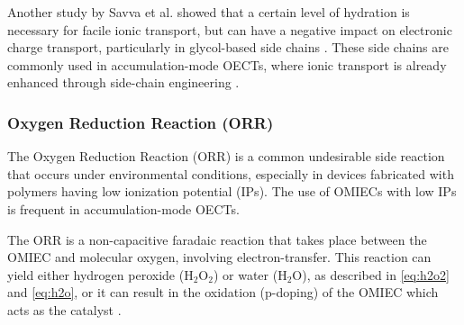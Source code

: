 
Another study by Savva et al. showed that a certain level of hydration is necessary for facile ionic transport, but can have a negative impact on electronic charge transport, particularly in glycol-based side chains \cite{savvaBalancingIonicElectronic2020}. These side chains are commonly used in accumulation-mode OECTs, where ionic transport is already enhanced through side-chain engineering \cite{moiaDesignEvaluationConjugated2019}. %


\subsubsection{Oxygen Reduction Reaction (ORR)}

The Oxygen Reduction Reaction (ORR) is a common undesirable side reaction that occurs under environmental conditions, especially in devices fabricated with polymers having low ionization potential (IPs). The use of OMIECs with low IPs is frequent in accumulation-mode OECTs. 



The ORR is a non-capacitive faradaic reaction that takes place between the OMIEC and molecular oxygen, involving electron-transfer. This reaction can yield either hydrogen peroxide (H$_{2}$O$_{2}$) or water (H$_{2}$O), as described in \ref{eq:h2o2} and \ref{eq:h2o}, or it can result in the oxidation (p-doping) of the OMIEC which acts as the catalyst \cite{giovannittiEnergeticControlRedoxActive2020}. 

